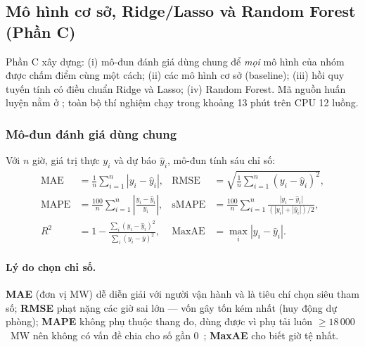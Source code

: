 \subsection{Mô hình cơ sở, Ridge/Lasso và Random Forest (Phần C)}\label{sec:models-c}

Phần C xây dựng: (i) mô-đun đánh giá dùng chung  để \emph{mọi} mô hình của nhóm được
chấm điểm cùng một cách; (ii) các mô hình cơ sở (baseline); (iii) hồi quy tuyến tính có điều chuẩn Ridge và
Lasso; (iv) Random Forest. Mã nguồn huấn luyện nằm ở ; toàn bộ thí nghiệm chạy trong
khoảng 13 phút trên CPU 12 luồng.

\subsubsection{Mô-đun đánh giá dùng chung }\label{sec:evaluate}

Với $n$ giờ, giá trị thực $y_i$ và dự báo $\hat{y}_i$, mô-đun tính sáu chỉ số:
\begin{align}
\mathrm{MAE} &= \frac1n\sum_{i=1}^n |y_i-\hat y_i|, &
\mathrm{RMSE} &= \sqrt{\frac1n\sum_{i=1}^n (y_i-\hat y_i)^2},\\
\mathrm{MAPE} &= \frac{100}{n}\sum_{i=1}^n \left|\frac{y_i-\hat y_i}{y_i}\right|, &
\mathrm{sMAPE} &= \frac{100}{n}\sum_{i=1}^n \frac{|y_i-\hat y_i|}{(|y_i|+|\hat y_i|)/2},\\
R^2 &= 1-\frac{\sum_i (y_i-\hat y_i)^2}{\sum_i (y_i-\bar y)^2}, &
\mathrm{MaxAE} &= \max_i |y_i-\hat y_i|.
\end{align}

\paragraph{Lý do chọn chỉ số.} \textbf{MAE} (đơn vị MW) dễ diễn giải với người vận hành và là tiêu chí
chọn siêu tham số; \textbf{RMSE} phạt nặng các giờ sai lớn --- vốn gây tốn kém nhất (huy động dự phòng);
\textbf{MAPE} không phụ thuộc thang đo, dùng được vì phụ tải luôn $\geq 18\,000$~MW nên không có vấn đề chia
cho số gần 0~\cite{hyndman2006accuracy}; \textbf{MaxAE} cho biết giờ tệ nhất.

